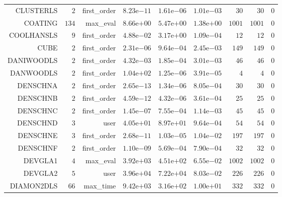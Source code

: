 \begin{longtable}{rrrrrrrrr}
CLUSTERLS & \(     2\) & first\_order & \( 8.23\)e\(-11\) & \( 1.61\)e\(-06\) & \( 1.01\)e\(-03\) & \(    30\) & \(    30\) & \(     0\) \\
COATING & \(   134\) & max\_eval & \( 8.66\)e\(+00\) & \( 5.47\)e\(+00\) & \( 1.38\)e\(+00\) & \(  1001\) & \(  1001\) & \(     0\) \\
COOLHANSLS & \(     9\) & first\_order & \( 4.88\)e\(-02\) & \( 3.17\)e\(+00\) & \( 1.09\)e\(-04\) & \(    12\) & \(    12\) & \(     0\) \\
CUBE & \(     2\) & first\_order & \( 2.31\)e\(-06\) & \( 9.64\)e\(-04\) & \( 2.45\)e\(-03\) & \(   149\) & \(   149\) & \(     0\) \\
DANIWOODLS & \(     2\) & first\_order & \( 4.32\)e\(-03\) & \( 1.85\)e\(-04\) & \( 3.01\)e\(-03\) & \(    46\) & \(    46\) & \(     0\) \\
DANWOODLS & \(     2\) & first\_order & \( 1.04\)e\(+02\) & \( 1.25\)e\(-06\) & \( 3.91\)e\(-05\) & \(     4\) & \(     4\) & \(     0\) \\
DENSCHNA & \(     2\) & first\_order & \( 2.65\)e\(-13\) & \( 1.34\)e\(-06\) & \( 8.05\)e\(-04\) & \(    30\) & \(    30\) & \(     0\) \\
DENSCHNB & \(     2\) & first\_order & \( 4.59\)e\(-12\) & \( 4.32\)e\(-06\) & \( 3.61\)e\(-04\) & \(    25\) & \(    25\) & \(     0\) \\
DENSCHNC & \(     2\) & first\_order & \( 1.45\)e\(-07\) & \( 7.55\)e\(-04\) & \( 1.14\)e\(-03\) & \(    45\) & \(    45\) & \(     0\) \\
DENSCHND & \(     3\) & user & \( 4.05\)e\(+01\) & \( 8.97\)e\(+01\) & \( 9.64\)e\(-04\) & \(    54\) & \(    54\) & \(     0\) \\
DENSCHNE & \(     3\) & first\_order & \( 2.68\)e\(-11\) & \( 1.03\)e\(-05\) & \( 1.04\)e\(-02\) & \(   197\) & \(   197\) & \(     0\) \\
DENSCHNF & \(     2\) & first\_order & \( 1.10\)e\(-09\) & \( 5.69\)e\(-04\) & \( 7.90\)e\(-04\) & \(    32\) & \(    32\) & \(     0\) \\
DEVGLA1 & \(     4\) & max\_eval & \( 3.92\)e\(+03\) & \( 4.51\)e\(+02\) & \( 6.55\)e\(-02\) & \(  1002\) & \(  1002\) & \(     0\) \\
DEVGLA2 & \(     5\) & user & \( 3.96\)e\(+04\) & \( 7.22\)e\(+04\) & \( 8.03\)e\(-02\) & \(   226\) & \(   226\) & \(     0\) \\
DIAMON2DLS & \(    66\) & max\_time & \( 9.42\)e\(+03\) & \( 3.16\)e\(+02\) & \( 1.00\)e\(+01\) & \(   332\) & \(   332\) & \(     0\) \\

\end{longtable}
